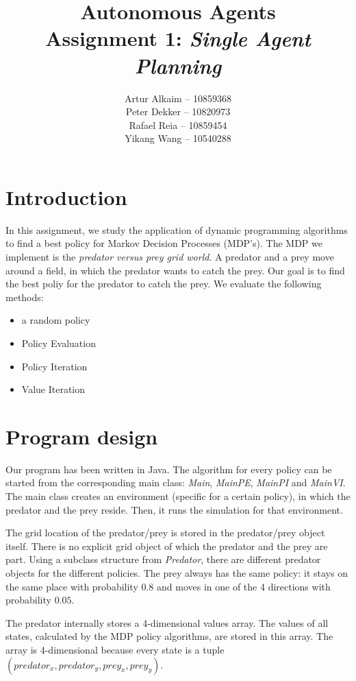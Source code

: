 \documentclass{article}
\begin{document}
\title{Autonomous Agents\\
Assignment 1: \emph{Single Agent Planning}}
\author{
Artur Alkaim -- 10859368\\
Peter Dekker -- 10820973\\
Rafael Reia -- 10859454\\
Yikang Wang -- 10540288\\
}
\maketitle
\section{Introduction}
In this assignment, we study the application of dynamic programming algorithms to find a best policy for Markov Decision Processes (MDP's). The MDP we implement is the \emph{predator versus prey grid world}. A predator and a prey move around a field, in which the predator wants to catch the prey. Our goal is to find the best poliy for the predator to catch the prey. We evaluate the following methods:
\begin{itemize}
\item a random policy
\item Policy Evaluation
\item Policy Iteration
\item Value Iteration
\end{itemize}
\section{Program design}
Our program has been written in Java. The algorithm for every policy can be started from the corresponding main class: \emph{Main}, \emph{MainPE}, \emph{MainPI} and \emph{MainVI}. The main class creates an environment (specific for a certain policy), in which the predator and the prey reside. Then, it runs the simulation for that environment. 

The grid location of the predator/prey is stored in the predator/prey object itself. There is no explicit grid object of which the predator and the prey are part. Using a subclass structure from \emph{Predator}, there are different predator objects for the different policies. The prey always has the same policy: it stays on the same place with probability $0.8$ and moves in one of the 4 directions with probability $0.05$.

The predator internally stores a 4-dimensional values array. The values of all states, calculated by the MDP policy algorithms, are stored in this array. The array is 4-dimensional because every state is a tuple $(predator_x,predator_y,prey_x,prey_y)$.
\end{document}
